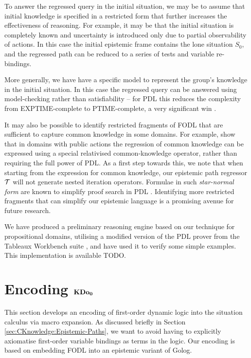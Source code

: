 To answer the regressed query in the initial situation, we may be
to assume that initial knowledge is specified in a restricted form
that further increases the effectiveness of reasoning. For example,
it may be that the initial situation is completely known and uncertainty
is introduced only due to partial observability of actions. In this
case the initial epistemic frame contains the lone situation $S_{0}$,
and the regressed path can be reduced to a series of tests and variable
re-bindings.

More generally, we have have a specific model to represent the group's
knowledge in the initial situation. In this case the regressed query
can be answered using model-checking rather than satisfiability --
for PDL this reduces the complexity from EXPTIME-complete to PTIME-complete,
a very significant win \citep{lange05pdl_model_checking}.

It may also be possible to identify restricted fragments of FODL that
are sufficient to capture common knowledge in some domains. For example,
\citet{vanBenthem06lcc} show that in domains with public actions
the regression of common knowledge can be expressed using a special
relativised common-knowledge operator, rather than requiring the full
power of PDL. As a first step towards this, we note that when starting
from the expression for common knowledge, our epistemic path regressor
$\mathcal{T}$ will not generate nested iteration operators. Formulae in
such \emph{star-normal form }are known to simplify proof search in
PDL \citep{abate07twb_pdl}. Identifying more restricted fragments
that can simplify our epistemic language is a promising avenue for
future research.

We have produced a preliminary reasoning engine based on our technique
for propositional domains, utilising a modified version of the PDL
prover from the Tableaux Workbench suite \citep{abate07twb_pdl},
and have used it to verify some simple examples. This implementation
is available TODO.


\section{Encoding $\mathbf{KDo_{0}}$\label{sec:CKnowledge:Encoding-KDoZ}}

This section develops an encoding of first-order dynamic logic into
the situation calculus via macro expansion. As discussed briefly in
Section \ref{sec:CKnowledge:Epistemic-Paths}, we want to avoid having
to explicitly axiomatise first-order variable bindings as terms in
the logic. Our encoding is based on embedding FODL into an epistemic
variant of Golog.

